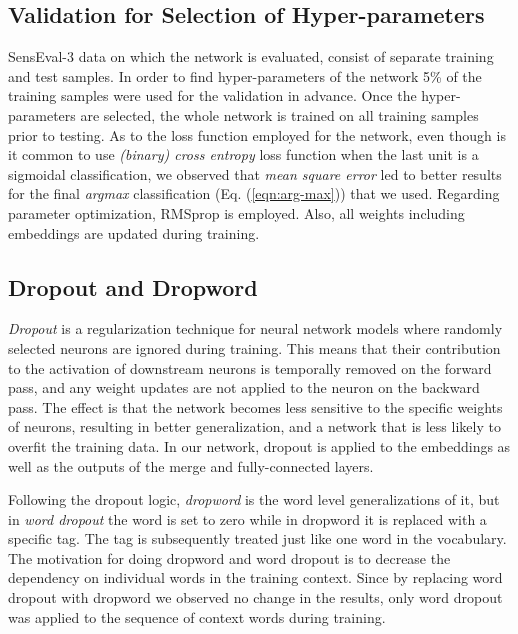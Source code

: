 \documentclass{llncs}
\begin{document}
\subsection{Validation for Selection of Hyper-parameters}
SensEval-3 data \cite{mihalcea2004senseval} on which the network is evaluated, consist of separate training and test samples. In order to find hyper-parameters of the network 5\% of the training samples were used for the validation in advance. Once the hyper-parameters are selected, the whole network is trained on all training samples prior to testing. As to the loss function employed for the network, even though is it common to use \textit{(binary) cross entropy} loss function when the last unit is a sigmoidal classification, we observed that \textit{mean square error} led to better results for the final \textit{argmax} classification (Eq. (\ref{eqn:arg-max})) that we used. Regarding parameter optimization,  RMSprop \cite{hinton2012rmsprop} is employed. Also, all weights including embeddings are updated during training.

\subsection{Dropout and Dropword}
\textit{Dropout} \cite{srivastava2014dropout} is a regularization technique for neural network models where randomly selected neurons are ignored during training. This means that their contribution to the activation of downstream neurons is temporally removed on the forward pass, and any weight updates are not applied to the neuron on the backward pass. The effect is that the network becomes less sensitive to the specific weights of neurons, resulting in better generalization, and a network that is less likely to overfit the training data. In our network, dropout is applied to the embeddings as well as the outputs of the merge and fully-connected layers.

Following the dropout logic, \textit{dropword} \cite{iyyer2015deep} is the word level generalizations of it, but in \textit{word dropout} the word is set to zero while in dropword it is replaced with a specific tag. The tag is subsequently treated just like one word in the vocabulary. The motivation for doing dropword and word dropout is to decrease the dependency on individual words in the training context. Since by replacing word dropout with dropword we observed no change in the results, only word dropout was applied to the sequence of context words during training.  
\end{document}
